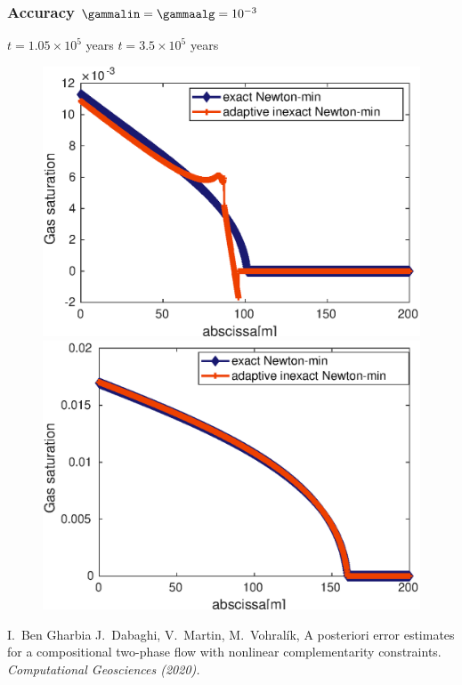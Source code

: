 %
\begin{frame}
\frametitle{Accuracy $\gammalin = \gammaalg = 10^{-3}$}
\vspace{-0.1 cm}
\textcolor{cadmiumgreen}{\hspace{2 cm} $t = 1.05 \times 10^5$ years \hspace{5 cm} $t = 3.5 \times 10^5$ years}
\begin{figure}
\centering
\includegraphics[width=0.48 \textwidth]{fig_article_chap_3/comparaison_plot_gas_saturations_exact_adapt_inexact_gamma_lin_gamma_alg_10-3_nt_21}
\includegraphics[width=0.48 \textwidth]{fig_article_chap_3/comparaison_plot_gas_saturations_exact_adapt_inexact_gamma_lin_gamma_alg_10-3_nt_70}
\end{figure}
\begin{thebibliography}{10}
 \scriptsize{
 {\sc I.~Ben Gharbia J.~Dabaghi, V.~Martin, M.~Vohral\'{i}k}, A posteriori error estimates for a compositional two-phase flow
with nonlinear complementarity constraints.
\em{Computational Geosciences} (2020).
}
 \end{thebibliography}
\end{frame}
